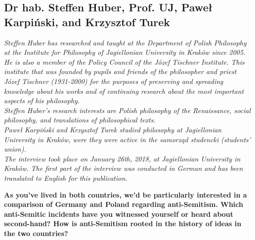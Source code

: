  \begin{flushleft}
 	\section{Dr hab. Steffen Huber, Prof. UJ, Paweł Karpiński, and Krzysztof Turek}
 \end{flushleft}

\textit{Steffen Huber has researched and taught at the Department of Polish Philosophy at the Institute for Philosophy of Jagiellonian University in Kraków since 2005. He is also a member of the Policy Council of the Józef Tischner Institute. This institute that was founded by pupils and friends of the philosopher and priest Józef Tischner (1931-2000) for the purposes of preserving and spreading knowledge about his works and of continuing research about the most important aspects of his philosophy.\\ 
Steffen Huber's research interests are Polish philosophy of the Renaissance, social philosophy, and translations of philosophical texts.\\ 
Paweł Karpiński and Krzysztof Turek studied philosophy at Jagiellonian University in Kraków, were they were active in the \textit{samorząd studencki} (students' union).\\ 
The interview took place on January 26th, 2018, at Jagiellonian University in Kraków. The first part of the interview was conducted in German and has been translated to English for this publication.}\par
\vspace*{2em}
\textbf{As you've lived in both countries, we'd be particularly interested in a comparison of Germany and Poland regarding anti-Semitism. Which anti-Semitic incidents have you witnessed yourself or heard about second-hand? How is anti-Semitism rooted in the history of ideas in the two countries?} 

